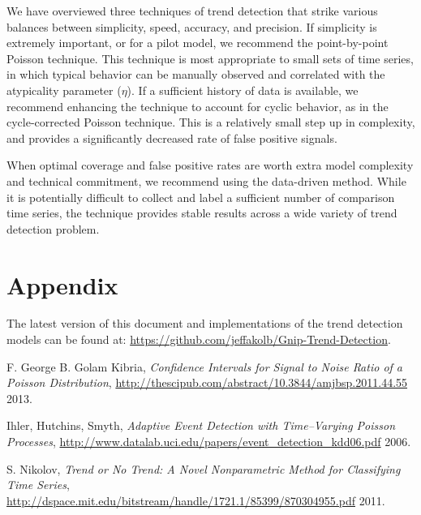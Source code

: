 \documentclass{article}
\begin{document}
We have overviewed three techniques of trend detection that strike various
balances between simplicity, speed, accuracy, and precision.
If simplicity is extremely important, or for a pilot model, we
recommend the point-by-point Poisson technique. This technique is most
appropriate to small sets of time series, in which typical behavior can be
manually observed and correlated with the atypicality parameter ($\eta$). If a 
sufficient history of data is available, we recommend enhancing the technique
to account for cyclic behavior, as in the cycle-corrected Poisson technique.
This is a relatively small step up in complexity, and provides a significantly
decreased rate of false positive signals. 

When optimal coverage and false positive rates are worth extra model complexity
and technical commitment, we recommend using the data-driven method. While it
is potentially difficult to collect and label a sufficient number of comparison
time series, the technique provides stable results across a wide variety of
trend detection problem. 


\appendix
\section{Appendix}
The latest version of this document 
and implementations of the trend detection models 
can be found at:
\noindent \url{https://github.com/jeffakolb/Gnip-Trend-Detection}.

%



\begin{thebibliography}{2013}

 F. George B. Golam Kibria, \textsl{Confidence
    Intervals for Signal to Noise Ratio of a Poisson Distribution},
    \url{http://thescipub.com/abstract/10.3844/amjbsp.2011.44.55} 2013.

 Ihler, Hutchins, Smyth, \textsl{Adaptive Event
    Detection with Time–Varying Poisson Processes},
    \url{http://www.datalab.uci.edu/papers/event_detection_kdd06.pdf} 2006.

 S. Nikolov, \textsl{Trend or No Trend: A Novel
    Nonparametric Method for Classifying Time Series},
    \url{http://dspace.mit.edu/bitstream/handle/1721.1/85399/870304955.pdf}
    2011.  

\end{thebibliography}
\end{document}
